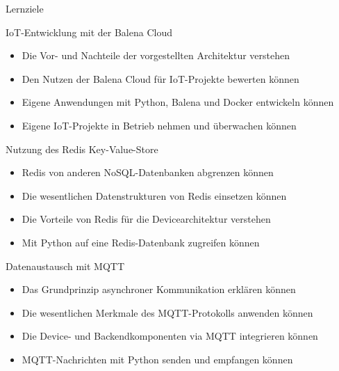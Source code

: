 {
\scriptsize

\begin{frame}{Lernziele}
    \begin{block}{IoT-Entwicklung mit der Balena Cloud}
        \begin{itemize}
            \setlength\itemsep{.5em}

            \item Die Vor- und Nachteile der vorgestellten Architektur verstehen
            \item Den Nutzen der Balena Cloud für IoT-Projekte bewerten können
            \item Eigene Anwendungen mit Python, Balena und Docker entwickeln können
            \item Eigene IoT-Projekte in Betrieb nehmen und überwachen können
        \end{itemize}
    \end{block}

    \begin{block}{Nutzung des Redis Key-Value-Store}
        \begin{itemize}
            \setlength\itemsep{.5em}

            \item Redis von anderen NoSQL-Datenbanken abgrenzen können
            \item Die wesentlichen Datenstrukturen von Redis einsetzen können
            \item Die Vorteile von Redis für die Devicearchitektur verstehen
            \item Mit Python auf eine Redis-Datenbank zugreifen können
        \end{itemize}
    \end{block}

    \begin{block}{Datenaustausch mit MQTT}
        \begin{itemize}
            \setlength\itemsep{.5em}

            \item Das Grundprinzip asynchroner Kommunikation erklären können
            \item Die wesentlichen Merkmale des MQTT-Protokolls anwenden können
            \item Die Device- und Backendkomponenten via MQTT integrieren können
            \item MQTT-Nachrichten mit Python senden und empfangen können
        \end{itemize}
    \end{block}
\end{frame}
}

